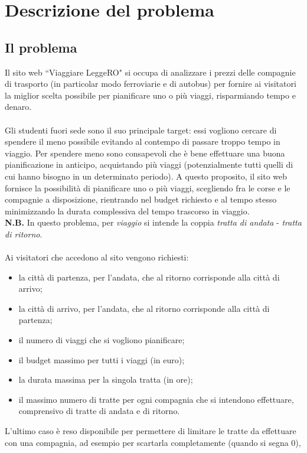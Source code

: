 \documentclass[main.tex]{subfiles}
\begin{document}
\section{Descrizione del problema}
\subsection{Il problema}
Il sito web ``Viaggiare LeggeRO" si occupa di analizzare i prezzi delle compagnie di trasporto (in particolar modo ferroviarie e di autobus) per fornire
ai visitatori la miglior scelta possibile per pianificare uno o più viaggi, risparmiando tempo e denaro.\\ \\
Gli studenti fuori sede sono il suo principale target: essi vogliono cercare di spendere il meno possibile evitando al contempo di passare troppo tempo in viaggio.
Per spendere meno sono consapevoli che è bene effettuare una buona pianificazione in anticipo, acquistando più viaggi (potenzialmente tutti quelli di cui hanno bisogno in un determinato periodo).
A questo proposito, il sito web fornisce la possibilità di pianificare uno o più viaggi, scegliendo fra le corse e le compagnie a disposizione, 
rientrando nel budget richiesto e al tempo stesso minimizzando la durata complessiva del tempo trascorso in viaggio.\\
\textbf{N.B.} In questo problema, per \textit{viaggio} si intende la coppia \textit{tratta di andata} - \textit{tratta di ritorno}.\\ \\
Ai visitatori che accedono al sito vengono richiesti:
\begin{itemize}
    \item la città di partenza, per l'andata, che al ritorno corrisponde alla città di arrivo;
    \item la città di arrivo, per l'andata, che al ritorno corrisponde alla città di partenza;
    \item il numero di viaggi che si vogliono pianificare;
    \item il budget massimo per tutti i viaggi (in euro);
    \item la durata massima per la singola tratta (in ore);
    \item il massimo numero di tratte per ogni compagnia che si intendono effettuare, comprensivo di tratte di andata e di ritorno.
\end{itemize}
L'ultimo caso è reso disponibile per permettere di limitare le tratte da effettuare con una compagnia, ad esempio per scartarla completamente (quando si segna 0), 
\end{document}
